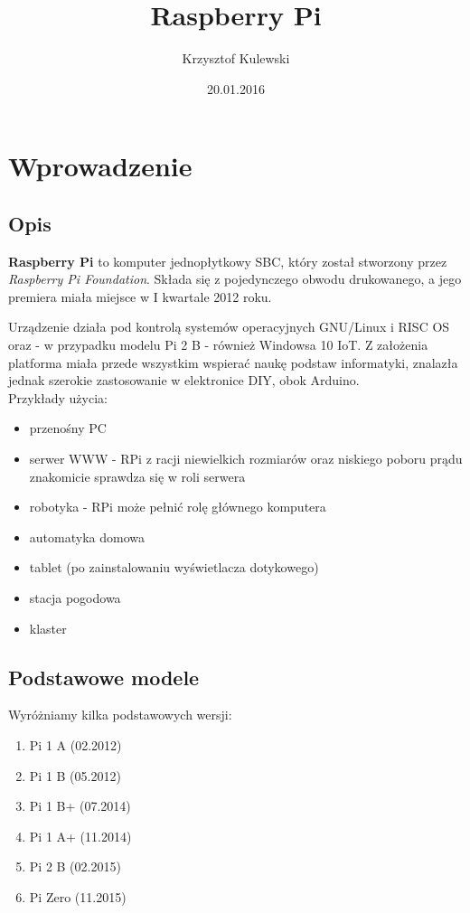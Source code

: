 \documentclass[titlepage]{article}
\author{Krzysztof Kulewski}
\title{Raspberry Pi}
\date{20.01.2016}
\begin{document}
\maketitle


\section{Wprowadzenie}
\subsection{Opis}
\textbf{Raspberry Pi} to komputer jednopłytkowy SBC, 
który został stworzony przez \textit{Raspberry Pi Foundation\cite{rpif}}.
Składa się z pojedynczego obwodu drukowanego, a jego premiera 
miała miejsce w I kwartale 2012 roku.

Urządzenie działa pod kontrolą systemów operacyjnych GNU/Linux i RISC OS oraz - w przypadku modelu Pi 2 B - również Windowsa 10 IoT.
Z założenia platforma miała przede wszystkim wspierać naukę 
podstaw informatyki, znalazła jednak szerokie zastosowanie w elektronice DIY, obok Arduino.
\\
Przykłady użycia:
\begin{itemize}
	\item przenośny PC
	\item serwer WWW - RPi z racji niewielkich rozmiarów oraz niskiego poboru prądu znakomicie sprawdza się w roli serwera
	\item robotyka - RPi może pełnić rolę głównego komputera
	\item automatyka domowa
	\item tablet (po zainstalowaniu wyświetlacza dotykowego)
	\item stacja pogodowa
	\item klaster
\end{itemize}
\subsection{Podstawowe modele}
Wyróżniamy kilka podstawowych wersji: 
\begin{enumerate}
	\item Pi 1 A (02.2012)
	\item Pi 1 B (05.2012)
	\item Pi 1 B+ (07.2014)
	\item Pi 1 A+ (11.2014)
	\item Pi 2 B (02.2015)
	\item Pi Zero (11.2015)
\end{enumerate}
\end{document}
